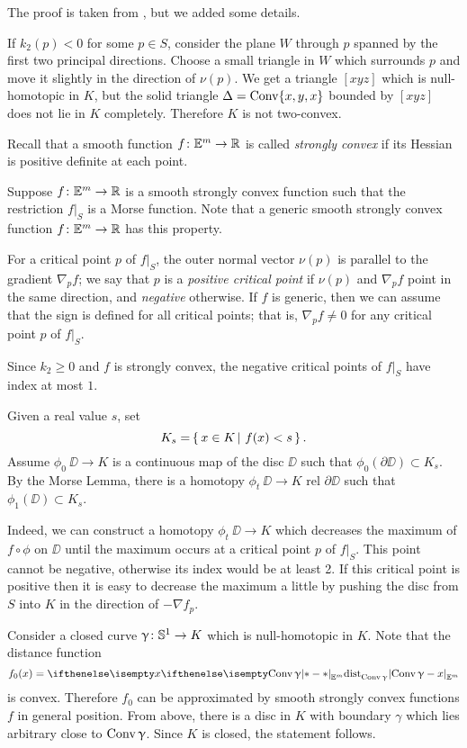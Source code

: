 The proof is taken from \cite[\S\textonehalf]{gromov:SaGMC}, but we added  some details.

If $k_2(p)<0$ for some $p\in S$,
consider the plane $W$ through $p$  spanned by the first two principal directions.
Choose a small triangle in $W$ which surrounds $p$ and move it slightly in the direction of $\nu(p)$.
We get a triangle $[xyz]$ which is null-homotopic in $K$,
but the solid triangle $\Delta=\mathop{\rm Conv}\nolimits\{x,y,x\}$ bounded by $[xyz]$ does not lie in $K$ completely.
Therefore $K$ is not two-convex.

Recall that a smooth function $f\:\EE^m\to\RR$ is called \emph{strongly convex} if its Hessian is
 positive definite at each point.


Suppose $f\:\EE^m\to\RR$ is a smooth strongly
convex function 
such that the restriction $f|_S$ is a Morse function.
Note that a generic smooth strongly convex function $f\:\EE^m\to\RR$ has this property.

For a critical point $p$ of $f|_S$, the outer normal vector $\nu(p)$ is parallel to the gradient $\nabla_pf$;
we say that $p$ is a 
\emph{positive critical point}
if $\nu(p)$ and $\nabla_p f$ point in the same direction, 
and 
\emph{negative} otherwise.
If $f$ is generic, then we can assume that the sign is defined for all critical points;
that is, $\nabla_pf\ne0$ for any critical point $p$ of $f|_S$.

Since $k_2\ge 0$ and $f$ is strongly convex, 
the negative critical points of $f|_S$
have index at most $1$.

Given a real value $s$, set 
\[K_s=\set{x\in K}{f(x)<s}.\]
Assume  $\phi_0\:\DD\to K$ is a continuous map of the disc $\DD$
such that $\phi_0(\partial \DD)\subset K_s$.
By the Morse Lemma, 
there is a homotopy $\phi_t\:\DD\to K$ rel $\partial \DD$ such that 
$\phi_1(\DD)\subset K_s$.

Indeed, we can construct a homotopy $\phi_t\:\DD\to K$ which decreases the maximum of $f\circ\phi$ on $\DD$ until the maximum occurs at a critical point $p$ of $f|_S$.
This point cannot be negative, otherwise its index would be at least 2.
If this critical point is positive then it is easy to decrease the maximum a little by pushing the disc from $S$ into $K$ in the direction of $-\nabla f_p$.

Consider a closed curve $\gamma\:\SS^1\to K$ which is null-homotopic in $K$.
Note that the distance function \[f_0(x)\z=\dist{\Conv\gamma}{x}{\EE^m}\] 
is convex.
Therefore $f_0$ can be approximated by smooth strongly convex functions $f$ in general position.
From above, there is a disc in $K$ with boundary $\gamma$
which lies arbitrary close to $\mathop{\rm Conv}\nolimits\upgamma$.
Since $K$ is closed, the statement follows.
\qeds

